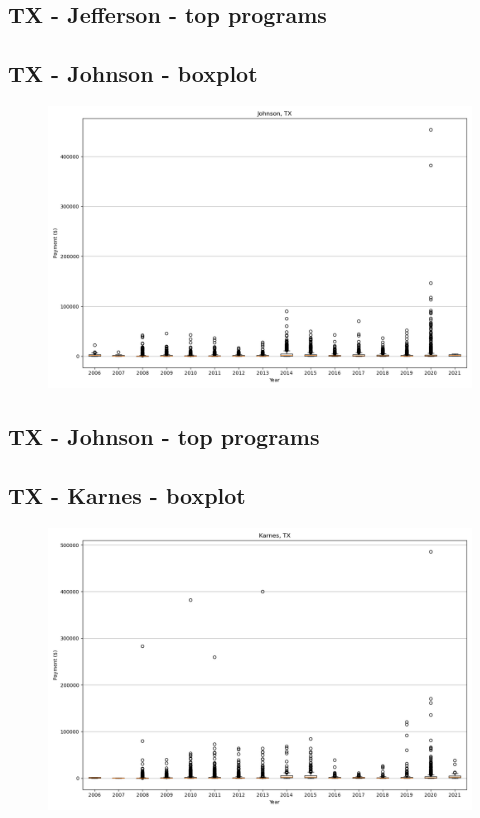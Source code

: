 \subsection*{TX - Jefferson - top programs}

\newpage
\subsection*{TX - Johnson - boxplot}
\begin{figure}[h]
\centering
\includegraphics[width=7in]{../output/boxplots/counties/Johnson-TX_boxplot.png}
\end{figure}


\subsection*{TX - Johnson - top programs}

\newpage
\subsection*{TX - Karnes - boxplot}
\begin{figure}[h]
\centering
\includegraphics[width=7in]{../output/boxplots/counties/Karnes-TX_boxplot.png}
\end{figure}


